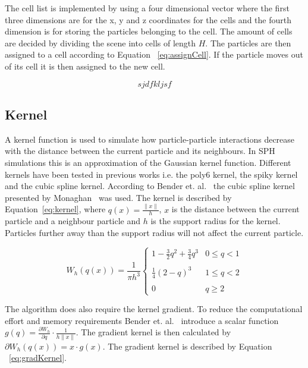    The cell list is implemented by using a four dimensional vector where the first three dimensions are for the x, y and z coordinates for the cells and the fourth dimension is for storing the particles belonging to the cell.
    The amount of cells are decided by dividing the scene into cells of length $H$.
    The particles are then assigned to a cell according to Equation ~\ref{eq:assignCell}.
    If the particle moves out of its cell it is then assigned to the new cell.

    \begin{equation} \label{eq:assignCell}
        sjdfkljsf
    \end{equation}

\subsection{Kernel}
    A kernel function is used to simulate how particle-particle interactions decrease with the distance between the current particle and its neighbours. In SPH simulations this is an approximation of the Gaussian kernel function. Different kernels have been tested in previous works i.e. the poly6 kernel, the spiky kernel and the cubic spline kernel. According to Bender et. al.~\cite{bender} the cubic spline kernel presented by Monaghan~\cite{monaghan} was used. The kernel is described by Equation~\ref{eq:kernel}, where $q(x)=\frac{\left \| x \right \|}{h}$, $x$ is the distance between the current particle and a neighbour particle and $h$ is the support radius for the kernel. Particles further away than the support radius will not affect the current particle.   

    \begin{equation} \label{eq:kernel}
        W_h(q(x)) =  \frac{1}{\pi h^3} \left\{\begin{matrix}
        1 - \frac{3}{2}q^2 + \frac{3}{4}q^3 & 0 \leqslant q < 1 \\ 
        \\
        \frac{1}{4}(2-q)^3 & 1 \leqslant q < 2\\ 
        \\
        0 & q \geqslant 2
      \end{matrix}\right.
    \end{equation}

    The algorithm does also require the kernel gradient. To reduce the computational effort and memory requirements Bender et. al.~\cite{bender} introduce a scalar function $g(q) = \frac{\partial W_h}{\partial q} \cdot \frac{1}{h \left \| x \right \|}$. The gradient kernel is then calculated by $\partial W_h(q(x)) = x \cdot g(x)$. The gradient kernel is described by Equation ~\ref{eq:gradKernel}. 

